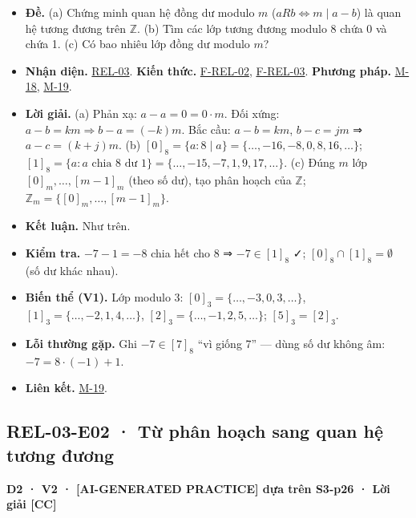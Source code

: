 \documentclass[
  10pt,
  twoside,openany]{book}
\providecommand{\tightlist}{%
  \setlength{\itemsep}{0pt}\setlength{\parskip}{0pt}}
\begin{document}
\begin{itemize}
\tightlist
\item
  \textbf{Đề.} (a) Chứng minh quan hệ đồng dư modulo \(m\)
  (\(aRb\Leftrightarrow m\mid a-b\)) là quan hệ tương đương trên
  \(\mathbb Z\). (b) Tìm các lớp tương đương modulo 8 chứa 0 và chứa 1.
  (c) Có bao nhiêu lớp đồng dư modulo \(m\)?
\item
  \textbf{Nhận diện.} \protect\hyperlink{REL-03}{REL-03}. \textbf{Kiến
  thức.} \protect\hyperlink{F-REL-02}{F-REL-02},
  \protect\hyperlink{F-REL-03}{F-REL-03}. \textbf{Phương pháp.}
  \protect\hyperlink{M-18}{M-18}, \protect\hyperlink{M-19}{M-19}.
\item
  \textbf{Lời giải.} (a) Phản xạ: \(a-a=0=0\cdot m\). Đối xứng:
  \(a-b=km\Rightarrow b-a=(-k)m\). Bắc cầu: \(a-b=km\), \(b-c=jm\) ⇒
  \(a-c=(k+j)m\). (b)
  \([0]_8=\{a: 8\mid a\}=\{\dots,-16,-8,0,8,16,\dots\}\);
  \([1]_8=\{a: a\text{ chia 8 dư 1}\}=\{\dots,-15,-7,1,9,17,\dots\}\).
  (c) Đúng \(m\) lớp \([0]_m,\dots,[m-1]_m\) (theo số dư), tạo phân
  hoạch của \(\mathbb Z\); \(\mathbb Z_m=\{[0]_m,\dots,[m-1]_m\}\).
\item
  \textbf{Kết luận.} Như trên.
\item
  \textbf{Kiểm tra.} \(-7-1=-8\) chia hết cho 8 ⇒ \(-7\in[1]_8\) ✓;
  \([0]_8\cap[1]_8=\emptyset\) (số dư khác nhau).
\item
  \textbf{Biến thể (V1).} Lớp modulo 3:
  \([0]_3=\{\dots,-3,0,3,\dots\}\), \([1]_3=\{\dots,-2,1,4,\dots\}\),
  \([2]_3=\{\dots,-1,2,5,\dots\}\); \([5]_3=[2]_3\).
\item
  \textbf{Lỗi thường gặp.} Ghi \(-7\in[7]_8\) ``vì giống 7'' --- dùng số
  dư không âm: \(-7=8\cdot(-1)+1\).
\item
  \textbf{Liên kết.} \protect\hyperlink{M-19}{M-19}.
\end{itemize}

\hypertarget{REL-03-E02}{%
\subsection{REL-03-E02 · Từ phân hoạch sang quan hệ tương
đương}\label{REL-03-E02}}

\textbf{D2 · V2 · {[}AI-GENERATED PRACTICE{]} dựa trên S3-p26 · Lời giải
{[}CC{]}}
\end{document}
